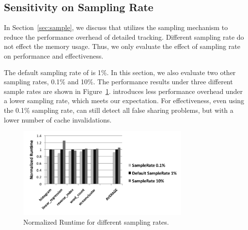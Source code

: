\subsection{Sensitivity on Sampling Rate}
\label{sec:sensitivity}
In Section~\ref{sec:sample}, we discuss that \Predator{} utilizes the sampling mechanism to reduce the performance overhead of detailed tracking. Different sampling rate do not effect the memory usage. Thus, we only evaluate the effect of sampling rate on performance and effectiveness. 

The default sampling rate of \Predator{} is 1\%. In this section, we also evaluate two other sampling rates, 0.1\% and 10\%. The performance results under three different sample rates are shown in Figure~\ref{fig:sample}. \Predator{} introduces less performance overhead under a lower sampling rate, which meets our expectation. For effectiveness, even using the 0.1\% sampling rate, \Predator{} can still detect all false sharing problems, but with a lower number of cache invalidations. 
 
\begin{figure}
\begin{center} 
\includegraphics[width=3.4in]{fig/sample}
\end{center}
\caption{Normalized Runtime for different sampling rates.}
\label{fig:sample}
\end{figure}


